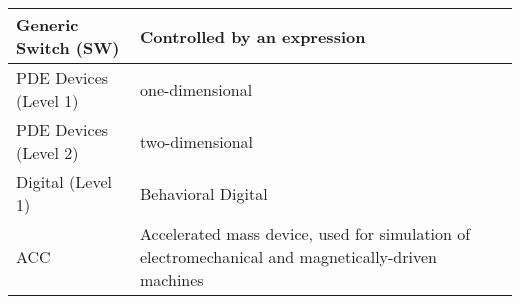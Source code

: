 \begin{longtable}[h] {>{\raggedright\small}m{2in}|>{\raggedright\let\\\tabularnewline\small}m{3.5in}}
    Generic Switch (SW) & Controlled by an expression\\ \hline

    PDE Devices (Level 1) & one-dimensional\\ \hline

    PDE Devices (Level 2) & two-dimensional\\ \hline

    Digital (Level 1)  & Behavioral Digital \\ \hline

    ACC & Accelerated mass device, used for simulation of electromechanical and magnetically-driven machines \\ \hline

\end{longtable}


